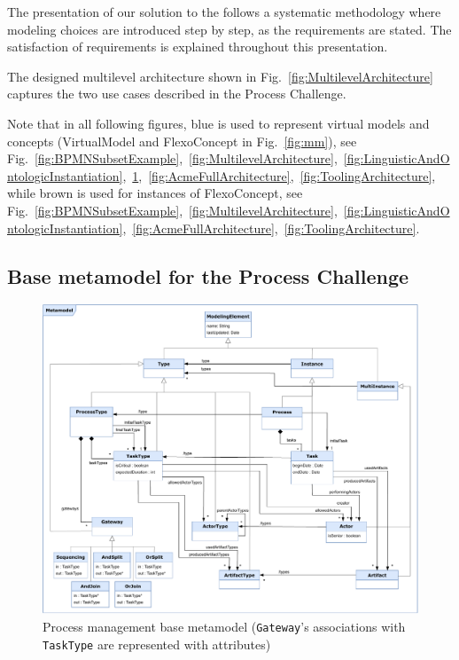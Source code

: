 
The presentation of our solution to the \mlpc follows a systematic methodology
where modeling choices are introduced step by step, as the requirements are
stated. The satisfaction of requirements is explained throughout this
presentation.


The designed multilevel architecture shown in
Fig.~\ref{fig:MultilevelArchitecture} captures the two use cases described in
the Process Challenge.

Note that in all following figures, blue is used to represent \FML virtual
models and concepts (\textsf{VirtualModel} and \textsf{FlexoConcept} in
Fig.~\ref{fig:mm}), see
Fig.~\ref{fig:BPMNSubsetExample},~\ref{fig:MultilevelArchitecture},~\ref{fig:LinguisticAndOntologicInstantiation},~\ref{fig:BaseMetamodel},~\ref{fig:AcmeFullArchitecture},~\ref{fig:ToolingArchitecture},
while brown is used for instances of \textsf{FlexoConcept}, see
Fig.~\ref{fig:BPMNSubsetExample},~\ref{fig:MultilevelArchitecture},~\ref{fig:LinguisticAndOntologicInstantiation},~\ref{fig:AcmeFullArchitecture},~\ref{fig:ToolingArchitecture}.

\subsection{Base metamodel for the Process Challenge}

\begin{figure}
 \centering
    \includegraphics[width=1.0 \textwidth]{Figures/Metamodel-1.5.pdf}
     \caption{Process management base metamodel (\texttt{Gateway}'s associations with \texttt{TaskType} are represented with attributes)}
    \label{fig:BaseMetamodel}
\end{figure}

